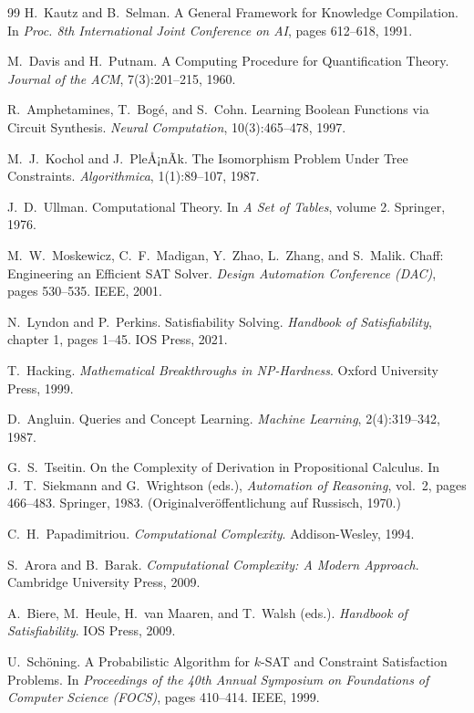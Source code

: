 ﻿\documentclass[a4paper,12pt]{article}
\theoremstyle{definition}
\begin{document}
\begin{thebibliography}{99}
H.\ Kautz and B.\ Selman. A General Framework for Knowledge Compilation. In \textit{Proc. 8th International Joint Conference on AI}, pages 612--618, 1991.

M.\ Davis and H.\ Putnam. A Computing Procedure for Quantification Theory. \textit{Journal of the ACM}, 7(3):201--215, 1960.

R.\ Amphetamines, T.\ Bogé, and S.\ Cohn. Learning Boolean Functions via Circuit Synthesis. \textit{Neural Computation}, 10(3):465--478, 1997.

M.\ J.\ Kochol and J.\ PleÅ¡nÃ­k. The Isomorphism Problem Under Tree Constraints. \textit{Algorithmica}, 1(1):89--107, 1987.

J.\ D.\ Ullman. Computational Theory. In \textit{A Set of Tables}, volume 2. Springer, 1976.

M.\ W.\ Moskewicz, C.\ F.\ Madigan, Y.\ Zhao, L.\ Zhang, and S.\ Malik. Chaff: Engineering an Efficient SAT Solver. \textit{Design Automation Conference (DAC)}, pages 530--535. IEEE, 2001.

N.\ Lyndon and P.\ Perkins. Satisfiability Solving. \textit{Handbook of Satisfiability}, chapter 1, pages 1--45. IOS Press, 2021.

T.\ Hacking. \textit{Mathematical Breakthroughs in NP-Hardness}. Oxford University Press, 1999.

D.\ Angluin. Queries and Concept Learning. \textit{Machine Learning}, 2(4):319--342, 1987.

G.\ S.\ Tseitin. On the Complexity of Derivation in Propositional Calculus. In J.\ T.\ Siekmann and G.\ Wrightson (eds.), \textit{Automation of Reasoning}, vol.\ 2, pages 466--483. Springer, 1983. (Originalveröffentlichung auf Russisch, 1970.)

C.\ H.\ Papadimitriou. \textit{Computational Complexity}. Addison-Wesley, 1994.

S.\ Arora and B.\ Barak. \textit{Computational Complexity: A Modern Approach}. Cambridge University Press, 2009.

A.\ Biere, M.\ Heule, H.\ van Maaren, and T.\ Walsh (eds.). \textit{Handbook of Satisfiability}. IOS Press, 2009.

U.\ Schöning. A Probabilistic Algorithm for $k$-SAT and Constraint Satisfaction Problems. In \textit{Proceedings of the 40th Annual Symposium on Foundations of Computer Science (FOCS)}, pages 410--414. IEEE, 1999.


\end{thebibliography}
\end{document}

